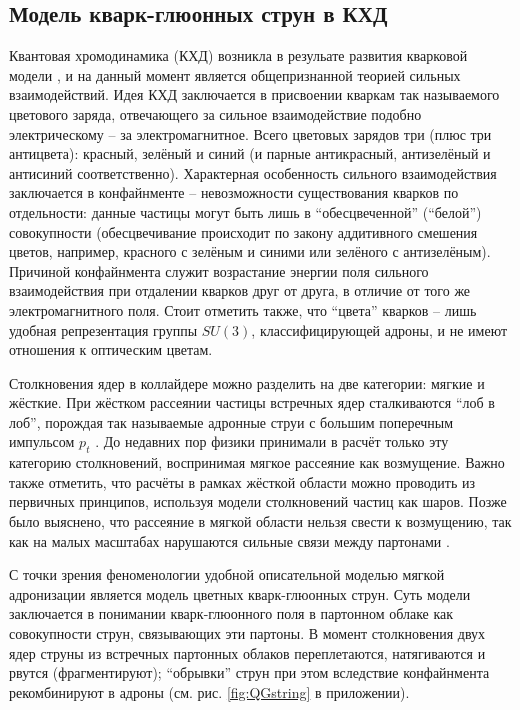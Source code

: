 \subsection{Модель кварк-глюонных струн в КХД}
Квантовая хромодинамика (КХД) возникла в резульате развития кварковой модели \cite{YndurainQCD}, и на данный момент является общепризнанной теорией сильных взаимодействий. Идея КХД заключается в присвоении кваркам так называемого цветового заряда, отвечающего за сильное взаимодействие подобно электрическому -- за электромагнитное. Всего цветовых зарядов три (плюс три антицвета): красный, зелёный и синий (и парные антикрасный, антизелёный и антисиний соответственно). Характерная особенность сильного взаимодействия заключается в конфайнменте -- невозможности существования кварков по отдельности: данные частицы могут быть лишь в ``обесцвеченной'' (``белой'') совокупности (обесцвечивание происходит по закону аддитивного смешения цветов, например, красного с зелёным и синими или зелёного с антизелёным). Причиной конфайнмента служит возрастание энергии поля сильного взаимодействия при отдалении кварков друг от друга, в отличие от того же электромагнитного поля. Стоит отметить также, что ``цвета'' кварков -- лишь удобная репрезентация группы $SU(3)$, классифицирующей адроны, и не имеют отношения к оптическим цветам.

Столкновения ядер в коллайдере можно разделить на две категории: мягкие и жёсткие. При жёстком рассеянии частицы встречных ядер сталкиваются ``лоб в лоб'', порождая так называемые адронные струи с большим поперечным импульсом $p_t$ \cite{HadronJet}. До недавних пор физики принимали в расчёт только эту категорию столкновений, воспринимая мягкое рассеяние как возмущение. Важно также отметить, что расчёты в рамках жёсткой области можно проводить из первичных принципов, используя модели столкновений частиц как шаров. Позже было выяснено, что рассеяние в мягкой области нельзя свести к возмущению, так как на малых масштабах нарушаются сильные связи между партонами \cite{SoftQCD1,SoftQCD2}.

С точки зрения феноменологии удобной описательной моделью мягкой адронизации является модель цветных кварк-глюонных струн\cite{ColorStringsModel1,ColorStringsModel2,ColorStringsModel3,ColorStringsModel4}. Суть модели заключается в понимании кварк-глюонного поля в партонном облаке как совокупности струн, связывающих эти партоны. В момент столкновения двух ядер струны из встречных партонных облаков переплетаются, натягиваются и рвутся (фрагментируют); ``обрывки'' струн при этом вследствие конфайнмента рекомбинируют в адроны (см. рис. \ref{fig:QGstring} в приложении). 
